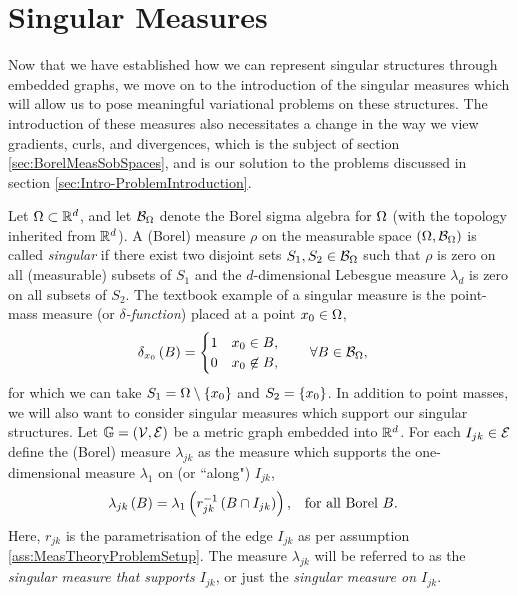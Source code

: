 \section{Singular Measures} \label{sec:SingularMeasures}
Now that we have established how we can represent singular structures through embedded graphs, we move on to the introduction of the singular measures which will allow us to pose meaningful variational problems on these structures.
The introduction of these measures also necessitates a change in the way we view gradients, curls, and divergences, which is the subject of section \ref{sec:BorelMeasSobSpaces}, and is our solution to the problems discussed in section \ref{sec:Intro-ProblemIntroduction}.

Let $\Omega\subset\mathbb{R}^d$, and let $\mathcal{B}_{\Omega}$ denote the Borel sigma algebra for $\Omega$ (with the topology inherited from $\mathbb{R}^d$).
A (Borel) measure $\rho$ on the measurable space $\left( \Omega,\mathcal{B}_{\Omega} \right)$ is called \emph{singular} if there exist two disjoint sets $S_1,S_2\in \mathcal{B}_{\Omega}$ such that $\rho$ is zero on all (measurable) subsets of $S_1$ and the $d$-dimensional Lebesgue measure $\lambda_d$ is zero on all subsets of $S_2$.
The textbook example of a singular measure is the point-mass measure (or \emph{$\delta$-function}) placed at a point $x_0\in\Omega$,
\begin{align*}
	\delta_{x_0}\left( B \right) &= \begin{cases} 1 & x_0\in B, \\ 0 & x_0\not\in B, \end{cases}
	\qquad \forall B\in\mathcal{B}_{\Omega},
\end{align*}
for which we can take $S_1=\Omega\setminus\left\{ x_0 \right\}$ and $S_2=\left\{ x_0 \right\}$.
In addition to point masses, we will also want to consider singular measures which support our singular structures.
Let $\mathbb{G}=\left( \mathcal{V}, \mathcal{E} \right)$ be a metric graph embedded into $\mathbb{R}^d$.
For each $I_{jk}\in\mathcal{E}$ define the (Borel) measure $\lambda_{jk}$ as the measure which supports the one-dimensional measure $\lambda_1$ on (or ``along") $I_{jk}$,
\begin{align*}
	\lambda_{jk}\left( B \right) = \lambda_{1}\left( r_{jk}^{-1}\left( B \cap I_{jk} \right) \right),
	&\quad\text{for all Borel } B.
\end{align*}
Here, $r_{jk}$ is the parametrisation of the edge $I_{jk}$ as per assumption \ref{ass:MeasTheoryProblemSetup}.
The measure $\lambda_{jk}$ will be referred to as the \emph{singular measure that supports $I_{jk}$}, or just the \emph{singular measure on $I_{jk}$}.
